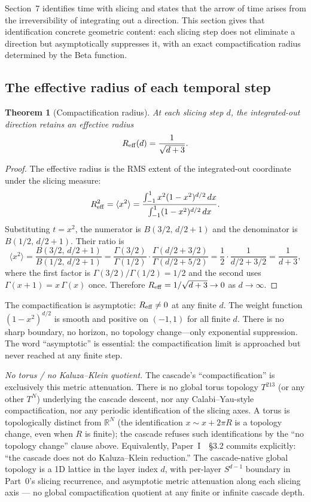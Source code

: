 \documentclass[12pt,a4paper]{article}
\newtheorem{theorem}{Theorem}[section]
\begin{document}
Section~7 identifies time with slicing and states that the arrow of time arises from the
irreversibility of integrating out a direction. This section gives that identification
concrete geometric content: each slicing step does not eliminate a direction but
asymptotically suppresses it, with an exact compactification radius determined by the Beta
function.

\subsection{The effective radius of each temporal step}

\begin{theorem}[Compactification radius]\label{thm:reff}
At each slicing step $d$, the integrated-out direction retains an effective radius
\[
R_{\rm eff}(d) = \frac{1}{\sqrt{d+3}}.
\]
\end{theorem}
\begin{proof}
The effective radius is the RMS extent of the integrated-out coordinate under the
slicing measure:
\[
R_{\rm eff}^2 = \langle x^2\rangle
= \frac{\int_{-1}^{1} x^2(1-x^2)^{d/2}\,dx}{\int_{-1}^{1}(1-x^2)^{d/2}\,dx}.
\]
Substituting $t = x^2$, the numerator is $B(3/2,\,d/2+1)$ and the denominator is
$B(1/2,\,d/2+1)$. Their ratio is
\[
\langle x^2\rangle = \frac{B(3/2,\,d/2+1)}{B(1/2,\,d/2+1)}
= \frac{\Gamma(3/2)}{\Gamma(1/2)}\cdot\frac{\Gamma(d/2+3/2)}{\Gamma(d/2+5/2)}
= \frac{1}{2}\cdot\frac{1}{d/2+3/2}
= \frac{1}{d+3},
\]
where the first factor is $\Gamma(3/2)/\Gamma(1/2) = 1/2$ and the second uses
$\Gamma(x+1) = x\,\Gamma(x)$ once.
Therefore $R_{\rm eff} = 1/\sqrt{d+3} \to 0$ as $d\to\infty$.
\end{proof}

The compactification is asymptotic: $R_{\rm eff}\neq 0$ at any finite $d$. The weight
function $(1-x^2)^{d/2}$ is smooth and positive on $(-1,1)$ for all finite $d$. There is
no sharp boundary, no horizon, no topology change---only exponential suppression. The word
``asymptotic'' is essential: the compactification limit is approached but never reached at
any finite step.

\medskip\noindent\emph{No torus / no Kaluza--Klein quotient.} The cascade's
``compactification'' is exclusively this metric attenuation. There is no global
torus topology $T^{213}$ (or any other $T^N$) underlying the cascade descent, nor
any Calabi--Yau-style compactification, nor any periodic identification of the
slicing axes. A torus is topologically distinct from $\mathbb{R}^N$ (the
identification $x \sim x + 2\pi R$ is a topology change, even when $R$ is
finite); the cascade refuses such identifications by the ``no topology change''
clause above. Equivalently, Paper~I~\cite{part0}~\S3.2 commits explicitly:
``the cascade does not do Kaluza--Klein reduction.''  The cascade-native global
topology is a 1D lattice in the layer index $d$, with per-layer $S^{d-1}$
boundary in Part~0's slicing recurrence, and asymptotic metric attenuation along
each slicing axis --- no global compactification quotient at any finite or
infinite cascade depth.
\end{document}
